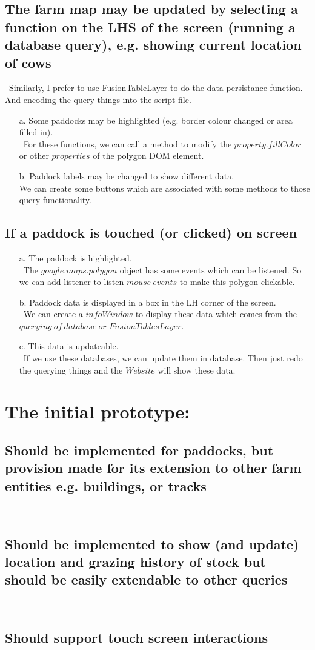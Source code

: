 \documentclass[titlepage,a4paper]{article}
\begin{document}
\subsection{The farm map may be updated by selecting a function on the LHS of the screen (running a database query), e.g. showing current location of cows}
\textbullet \ Similarly, I prefer to use FusionTableLayer to do the data persistance function. And encoding the query things into the script file.
\begin{enumerate}
\item[a.] Some paddocks may be highlighted (e.g. border colour changed or area filled-in).\\
\textbullet \ For these functions, we can call a method to modify the $property.fillColor$ or other $properties$ of the polygon DOM element. 
\item[b.] Paddock labels may be changed to show different data.\\
We can create some buttons which are associated with some methods to those query functionality.
\end{enumerate}
\subsection{If a paddock is touched (or clicked) on screen}
\begin{enumerate}
\item[a.] The paddock is highlighted.\\
\textbullet \ The $google.maps.polygon$ object has some events which can be listened. So we can add listener to listen $mouse\ events$ to make this polygon clickable.
\item[b.] Paddock data is displayed in a box in the LH corner of the screen.\\
\textbullet \ We can create a $infoWindow$ to display these data which comes from the $querying\ of\ database\ or$ $FusionTablesLayer$.
\item[c.] This data is updateable.\\
\textbullet \ If we use these databases, we can update them in database. Then just redo the querying things and the $Web site$ will show these data.
\end{enumerate}

\section{The initial prototype:}
\subsection{Should be implemented for paddocks,  but provision made for its extension to other farm entities e.g. buildings, or tracks}
\textbullet \ 
\subsection{Should be implemented to show (and update)   location and grazing history of stock but should be easily extendable to other queries}
\textbullet \ 
\subsection{Should support touch screen interactions}
\textbullet \ 
\end{document}
